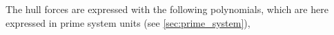The hull forces are expressed with the following polynomials, which are here expressed in prime system units (see \autoref{sec:prime_system}),
\begin{equation}
    \label{eq:X_H}
    
\end{equation}
%
\begin{equation}
    \label{eq:Y_H}
    
\end{equation}
%
\begin{equation}
    \label{eq:N_H}
    
\end{equation}